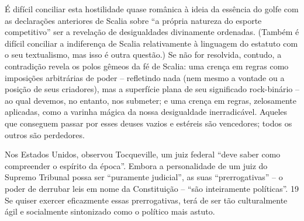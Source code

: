 É difícil conciliar esta hostilidade quase românica à ideia da essência do golfe com as declarações anteriores de Scalia sobre “a própria natureza do esporte competitivo” ser a revelação de desigualdades divinamente ordenadas. (Também é difícil conciliar a indiferença de Scalia relativamente à linguagem do estatuto com o seu textualismo, mas isso é outra questão.) Se não for resolvida, contudo, a contradição revela os polos gêmeos da fé de Scalia: uma crença em regras como imposições arbitrárias de poder – refletindo nada (nem mesmo a vontade ou a posição de seus criadores), mas a superfície plana de seu significado rock-binário – ao qual devemos, no entanto, nos submeter; e uma crença em regras, zelosamente aplicadas, como a varinha mágica da nossa desigualdade inerradicável. Aqueles que conseguem passar por esses deuses vazios e estéreis são vencedores; todos os outros são perdedores.
 
\par
 
Nos Estados Unidos, observou Tocqueville, um juiz federal “deve saber como compreender o espírito da época”. Embora a personalidade de um juiz do Supremo Tribunal possa ser “puramente judicial”, as suas “prerrogativas” – o poder de derrubar leis em nome da Constituição – “são inteiramente políticas”.
 {\color{blue} 19}  
Se quiser exercer eficazmente essas prerrogativas, terá de ser tão culturalmente ágil e socialmente sintonizado como o político mais astuto.
 
\par
 
